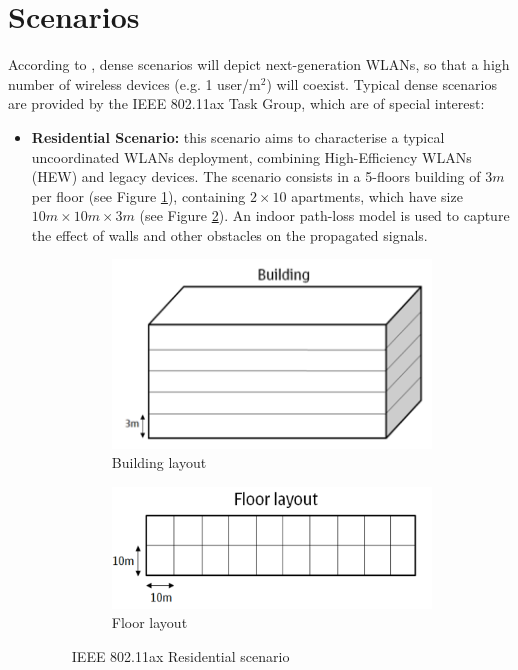 \documentclass[12pt, a4paper,twoside]{tesi_upf}
\begin{document}
		\section{Scenarios}
		\label{section:scenarios}	
		According to \cite{bellalta2016ieee}, dense scenarios will depict next-generation WLANs, so that a high number of wireless devices (e.g. 1 user/m$^2$) will coexist. Typical dense scenarios are provided by the IEEE 802.11ax Task Group, which are of special interest:
		\begin{itemize}			
			\item \textbf{Residential Scenario:} this scenario aims to characterise a typical uncoordinated WLANs deployment, combining High-Efficiency WLANs (HEW) and legacy devices. The scenario consists in a 5-floors building of $3 m$ per floor (see Figure \ref{fig:building}), containing $2 \times 10$ apartments, which have size $10 m \times 10 m \times 3 m$ (see Figure \ref{fig:floor}). An indoor path-loss model is used to capture the effect of walls and other obstacles on the propagated signals. 
			\begin{figure}[h!]
				\centering
				\begin{subfigure}[b]{0.4\textwidth}
					\includegraphics[width=\textwidth]{images/residential_ax_1}
					\caption{Building layout}
					\label{fig:building}
				\end{subfigure}
				\begin{subfigure}[b]{0.4\textwidth}
					\includegraphics[width=\textwidth]{images/residential_ax_2}
					\caption{Floor layout}
					\label{fig:floor}
				\end{subfigure}		
				\caption{IEEE 802.11ax Residential scenario}
				\label{fig:ax_residential_scenario}
			\end{figure}	
				

\end{itemize}
\end{document}
